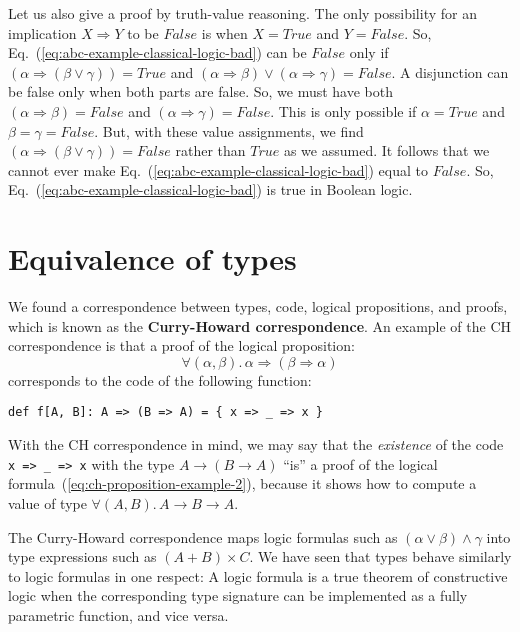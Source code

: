 Let us also give a proof by truth-value reasoning. The only possibility
for an implication $X\Rightarrow Y$ to be $False$ is when $X=True$
and $Y=False$. So, Eq.~(\ref{eq:abc-example-classical-logic-bad})
can be $False$ only if $\left(\alpha\Rightarrow(\beta\vee\gamma)\right)=True$
and $\left(\alpha\Rightarrow\beta\right)\vee\left(\alpha\Rightarrow\gamma\right)=False$.
A disjunction can be false only when both parts are false. So, we
must have both $\left(\alpha\Rightarrow\beta\right)=False$ and $\left(\alpha\Rightarrow\gamma\right)=False$.
This is only possible if $\alpha=True$ and $\beta=\gamma=False$.
But, with these value assignments, we find $\left(\alpha\Rightarrow(\beta\vee\gamma)\right)=False$
rather than $True$ as we assumed. It follows that we cannot ever
make Eq.~(\ref{eq:abc-example-classical-logic-bad}) equal to $False$.
So, Eq.~(\ref{eq:abc-example-classical-logic-bad}) is true in Boolean
logic.

\section{Equivalence of types}

We found a correspondence between types, code, logical propositions,
and proofs, which is known as the \textbf{Curry-Howard correspondence}.
An example of the CH correspondence is that a proof of the logical
proposition:
\begin{equation}
\forall(\alpha,\beta).\,\alpha\Rightarrow\left(\beta\Rightarrow\alpha\right)\label{eq:ch-proposition-example-2}
\end{equation}
corresponds to the code of the following function:
\begin{lstlisting}
def f[A, B]: A => (B => A) = { x => _ => x }
\end{lstlisting}
With the CH correspondence in mind, we may say that the \emph{existence}
of the code \lstinline!x => _ => x! with the type $A\rightarrow(B\rightarrow A)$
\textsf{``}is\textsf{''} a proof of the logical formula~(\ref{eq:ch-proposition-example-2}),
because it shows how to compute a value of type $\forall(A,B).\,A\rightarrow B\rightarrow A$.

The Curry-Howard correspondence maps logic formulas such as $(\alpha\vee\beta)\wedge\gamma$
into type expressions such as $\left(A+B\right)\times C$. We have
seen that types behave similarly to logic formulas in one respect:
A logic formula is a true theorem of constructive logic when the corresponding
type signature can be implemented as a fully parametric function,
and vice versa.

